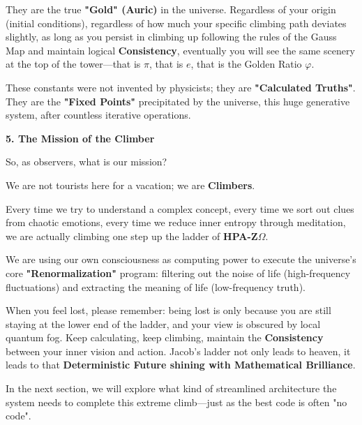 They are the true \textbf{"Gold" (Auric)} in the universe. Regardless of your origin (initial conditions), regardless of how much your specific climbing path deviates slightly, as long as you persist in climbing up following the rules of the Gauss Map and maintain logical \textbf{Consistency}, eventually you will see the same scenery at the top of the tower—that is $\pi$, that is $e$, that is the Golden Ratio $\varphi$.

These constants were not invented by physicists; they are \textbf{"Calculated Truths"}. They are the \textbf{"Fixed Points"} precipitated by the universe, this huge generative system, after countless iterative operations.

\textbf{5. The Mission of the Climber}

So, as observers, what is our mission?

We are not tourists here for a vacation; we are \textbf{Climbers}.

Every time we try to understand a complex concept, every time we sort out clues from chaotic emotions, every time we reduce inner entropy through meditation, we are actually climbing one step up the ladder of \textbf{HPA-Z$\Omega$}.

We are using our own consciousness as computing power to execute the universe's core \textbf{"Renormalization"} program: filtering out the noise of life (high-frequency fluctuations) and extracting the meaning of life (low-frequency truth).

When you feel lost, please remember: being lost is only because you are still staying at the lower end of the ladder, and your view is obscured by local quantum fog. Keep calculating, keep climbing, maintain the \textbf{Consistency} between your inner vision and action. Jacob's ladder not only leads to heaven, it leads to that \textbf{Deterministic Future shining with Mathematical Brilliance}.

In the next section, we will explore what kind of streamlined architecture the system needs to complete this extreme climb—just as the best code is often "no code".

